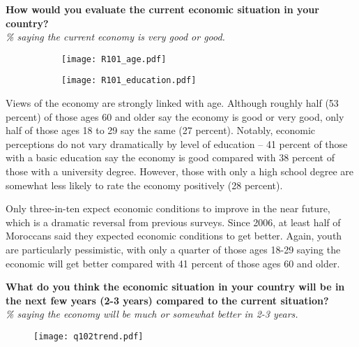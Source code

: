\documentclass[12pt]{article}
\begin{document}
	\pagebreak
		\begin{center}
		{\textbf{How would you evaluate the current economic situation in your country?}}\\
		\emph{\% saying the current economy is very good or good.}
		\end{center}
	\begin{figure}[H]
		\hspace{-1cm}\begin{minipage}{0.5\linewidth}
			\begin{figure}[H]
				\centering
				\texttt{[image: R101\_age.pdf]} 
			\end{figure}
		\end{minipage}
		\begin{minipage}{0.4\linewidth}
			\begin{figure}[H]
				\texttt{[image: R101\_education.pdf]}
			\end{figure}
			\end{minipage}
	\end{figure}
	
	\noindent Views of the economy are strongly linked with age.  Although roughly half (53 percent) of those ages 60 and older say the economy is good or very good, only half of those ages 18 to 29 say the same (27 percent). Notably, economic perceptions do not vary dramatically by level of education -- 41 percent of those with a basic education say the economy is good compared with 38 percent of those with a university degree. However, those with only a high school degree are somewhat less likely to rate the economy positively (28 percent).
	
	\noindent Only three-in-ten expect economic conditions to improve in the near future, which is a dramatic reversal from previous surveys. Since 2006, at least half of Moroccans said they expected economic conditions to get better. Again, youth are particularly pessimistic, with only a quarter of those ages 18-29 saying the economic will get better compared with 41 percent of those ages 60 and older.
	
	\pagebreak
		\begin{center}
		{\textbf{What do you think the economic situation in your country will be in the next few years (2-3 years) compared to the current situation?}}\\
		\emph{\% saying the economy will  be much or somewhat better in 2-3 years.}
		\begin{figure}[H]
			\centering
			\texttt{[image: q102trend.pdf]}
		\end{figure}
	\end{center}
\end{document}
